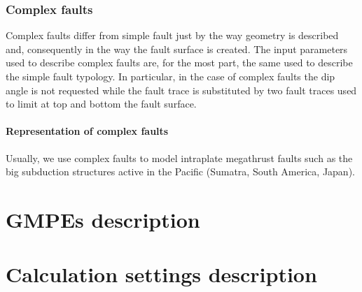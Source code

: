 \subsubsection{Complex faults}
%
Complex faults  differ from simple fault just by the way geometry is described and, consequently in the way the fault surface is created. The input parameters used to describe complex faults are, for the most part, the same used to describe the simple fault typology. In particular, in the case of complex faults the dip angle is not requested while the fault trace is substituted by two fault traces used to limit at top and bottom the fault surface. 
%
\paragraph{Representation of complex faults}
%
Usually, we use complex faults to model intraplate megathrust faults such as the 
big subduction structures active in the Pacific (Sumatra, South America, Japan).

%
\section{GMPEs description}
\label{hazard:gmpe_selection}
%

%
\section{Calculation settings description}
\label{hazard:calculation_settings}
%



